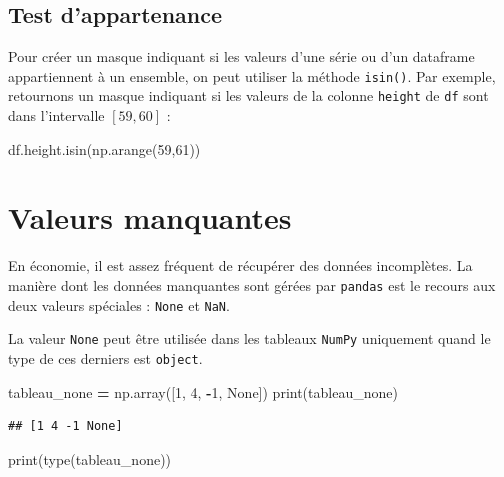 \documentclass[12pt,]{book}
\newenvironment{Shaded}{\begin{snugshade}}{\end{snugshade}}
\newcommand{\DecValTok}[1]{\textcolor[rgb]{0.00,0.00,0.81}{#1}}
\newcommand{\VariableTok}[1]{\textcolor[rgb]{0.00,0.00,0.00}{#1}}
\newcommand{\OperatorTok}[1]{\textcolor[rgb]{0.81,0.36,0.00}{\textbf{#1}}}
\newcommand{\BuiltInTok}[1]{#1}
\newcommand{\NormalTok}[1]{#1}
\numberwithin{equation}{section}
\numberwithin{countremarque}{section}
\begin{document}
\subsection{Test d'appartenance}\label{test-dappartenance-2}

Pour créer un masque indiquant si les valeurs d'une série ou d'un
dataframe appartiennent à un ensemble, on peut utiliser la méthode
\texttt{isin()}. Par exemple, retournons un masque indiquant si les
valeurs de la colonne \texttt{height} de \texttt{df} sont dans
l'intervalle \([59,60]\) :

\begin{Shaded}
\begin{Highlighting}[]
\NormalTok{df.height.isin(np.arange(}\DecValTok{59}\NormalTok{,}\DecValTok{61}\NormalTok{))}
\end{Highlighting}
\end{Shaded}

\section{Valeurs manquantes}\label{valeurs-manquantes}

En économie, il est assez fréquent de récupérer des données incomplètes.
La manière dont les données manquantes sont gérées par \texttt{pandas}
est le recours aux deux valeurs spéciales : \texttt{None} et
\texttt{NaN}.

La valeur \texttt{None} peut être utilisée dans les tableaux
\texttt{NumPy} uniquement quand le type de ces derniers est
\texttt{object}.

\begin{Shaded}
\begin{Highlighting}[]
\NormalTok{tableau_none }\OperatorTok{=}\NormalTok{ np.array([}\DecValTok{1}\NormalTok{, }\DecValTok{4}\NormalTok{, }\OperatorTok{-}\DecValTok{1}\NormalTok{, }\VariableTok{None}\NormalTok{])}
\BuiltInTok{print}\NormalTok{(tableau_none)}
\end{Highlighting}
\end{Shaded}

\begin{lstlisting}
## [1 4 -1 None]
\end{lstlisting}

\begin{Shaded}
\begin{Highlighting}[]
\BuiltInTok{print}\NormalTok{(}\BuiltInTok{type}\NormalTok{(tableau_none))}
\end{Highlighting}
\end{Shaded}
\end{document}
